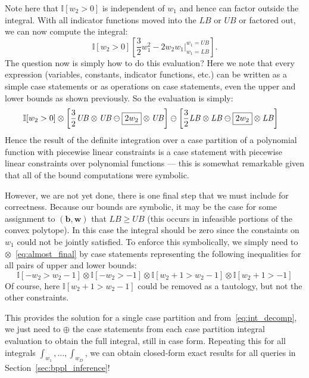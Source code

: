 \documentclass{article} %
\newcommand{\LB}{\mathit{LB}}
\newcommand{\UB}{\mathit{UB}}
\newcommand{\I}{\mathbb{I}}
\renewcommand{\vec}[1]{\mathbf{#1}}
\begin{document}
Note here that $\I[w_2 > 0]$ is independent of $w_1$ and hence
can factor outside the integral.  With all indicator functions
moved into the $\LB$ or $\UB$ or factored out, we can now compute
the integral:
\begin{equation}
\I[w_2 > 0] \left[ \frac{3}{2}w_1^2 - 2 w_2 w_1 \bigg|_{w_1=\LB}^{w_1=\UB} \right] .
\end{equation}
The question now is simply how to do this evaluation?  Here we note
that every expression (variables, constants, indicator functions, etc.) 
can be written as a 
simple case statements or as operations on case statements, even the upper
and lower bounds as shown previously.  So the evaluation is simply:
{\footnotesize
\begin{align}
 & \I[w_2 > 0] \otimes \left[ \frac{3}{2} \UB \otimes \UB \ominus \fbox{$2 w_2$} \otimes \UB \right] \ominus \left[ \frac{3}{2} \LB \otimes \LB \ominus \fbox{$2 w_2$} \otimes \LB \right] \label{eq:almost_final}
\end{align}}
Hence the result of the definite integration over a case
partition of a polynomial function with piecewise linear constraints
is a case statement with piecewise linear constraints over polynomial
functions --- this is somewhat remarkable given that
all of the bound computations were symbolic.  

However, we are not yet done, there is one final step that we must
include for correctness.  Because our bounds are symbolic, it may be
the case for some assignment to $(\vec{b},\vec{w})$ that $\LB \geq
\UB$ (this occurs in infeasible portions of the convex polytope).  
In this case the integral should be zero since the constaints
on $w_1$ could not be jointly satisfied.  To enforce this
symbolically, we simply need to $\otimes$~\eqref{eq:almost_final} by
case statements representing the following inequalities for all pairs
of upper and lower bounds:
\begin{equation}
\I[-w_2 > w_2 - 1] \otimes \I[-w_2 > -1] \otimes \I[w_2 + 1 > w_2 - 1] \otimes \I[w_2 + 1 > -1]
\end{equation}
Of course, here $\I[w_2 + 1 > w_2 - 1]$ could be removed as a tautology,
but not the other constraints.

This provides the solution for a single case partition and 
from~\eqref{eq:int_decomp}, we just need to $\oplus$ the case
statements from each case partition integral evaluation to obtain
the full integral, still in case form.  Repeating this for all integrals
$\int_{w_1},\ldots,\int_{w_D}$, we can obtain closed-form exact results
for all queries in Section~\ref{sec:bppl_inference}!
\end{document}
